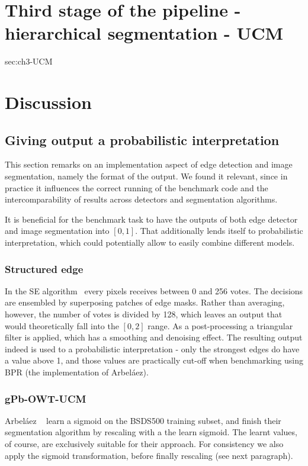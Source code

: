 \section[Third stage of the pipeline - UCM]{Third stage of the pipeline - hierarchical segmentation - UCM}
{sec:ch3-UCM}

\section{Discussion}
\subsection*{Giving output a probabilistic interpretation}
This section remarks on an implementation aspect of edge detection and image segmentation, namely the format of the output. We found it relevant, since in practice it influences the correct running of the benchmark code and the intercomparability %
of results across detectors and segmentation algorithms.

It is beneficial %
for the benchmark task to have the outputs of both edge detector and image segmentation into $[0,1]$. That additionally lends itself to probabilistic interpretation, which could potentially allow to easily combine different models.

\subsubsection*{Structured edge}
In the SE algorithm~\cite{DollarICCV13edges,Dollar2015PAMI} every pixels receives between 0 and 256 votes. The decisions are ensembled by superposing patches of edge masks. Rather than averaging, however, the number of votes is divided by 128, which leaves an output that would theoretically fall into the $[0, 2]$ range. As a post-processing a triangular filter is applied, which has a smoothing and denoising effect. The resulting output indeed is used to %
a probabilistic interpretation - only the strongest edges do have a value above 1, and those values are practically cut-off when benchmarking using BPR (the implementation of Arbel\'aez\etal).

\subsubsection*{gPb-OWT-UCM}
Arbel\'aez \etal~\cite{Arbelaez11} learn a sigmoid on the BSDS500 training subset, and finish their segmentation algorithm by rescaling with a the learn sigmoid. The learnt values, of course, are exclusively suitable for their approach. For consistency we also apply the sigmoid transformation, before finally rescaling (see next paragraph).

